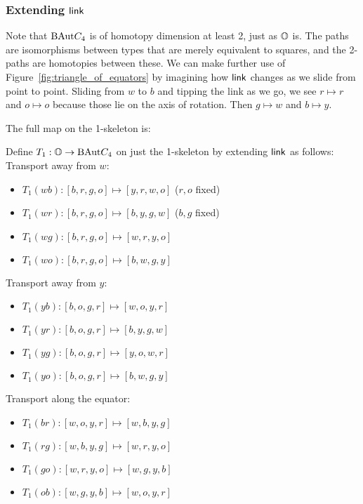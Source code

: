 \subsubsection{Extending \texorpdfstring{\( \mathsf{link} \)}{link}}

Note that \( \mathrm{BAut} C_4 \) is of homotopy dimension at least 2, just as \( \mathbb{O} \) is. The paths are isomorphisms between types that are merely equivalent to squares, and the 2-paths are homotopies between these. We can make further use of Figure~\ref{fig:triangle_of_equators} by imagining how \( \mathsf{link} \) changes as we slide from point to point. Sliding from \( w \) to \( b \) and tipping the link as we go, we see \( r\mapsto r \) and \( o\mapsto o \) because those lie on the axis of rotation. Then \( g\mapsto w \) and \( b\mapsto y \). 

The full map on the 1-skeleton is:
\begin{mydef}
Define \( T_1:\mathbb{O}\to\mathrm{BAut} C_4 \) on just the 1-skeleton by extending \( \mathsf{link} \) as follows:
Transport away from \( w \):
\begin{itemize}
\item \( T_1(wb):[b, r, g, o]\mapsto [y, r, w, o] \) (\( r, o \) fixed)
\item \( T_1(wr):[b, r, g, o]\mapsto [b, y, g, w] \) (\( b, g \) fixed)
\item \( T_1(wg):[b, r, g, o]\mapsto [w, r, y, o] \)
\item \( T_1(wo):[b, r, g, o]\mapsto [b, w, g, y] \)
\end{itemize}
Transport away from \( y \):
\begin{itemize}
\item \( T_1(yb):[b, o, g, r]\mapsto [w, o, y, r] \)
\item \( T_1(yr):[b, o, g, r]\mapsto [b, y, g, w] \)
\item \( T_1(yg):[b, o, g, r]\mapsto [y, o, w, r] \)
\item \( T_1(yo):[b, o, g, r]\mapsto [b, w, g, y] \)
\end{itemize}
Transport along the equator:
\begin{itemize}
\item \( T_1(br):[w, o, y, r]\mapsto [w, b, y, g] \) 
\item \( T_1(rg):[w, b, y, g]\mapsto [w, r, y, o] \)
\item \( T_1(go):[w, r, y, o]\mapsto [w, g, y, b] \)
\item \( T_1(ob):[w, g, y, b]\mapsto [w, o, y, r] \)
\end{itemize}
\end{mydef}

